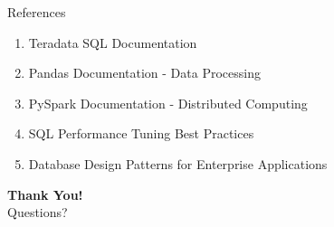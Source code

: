\documentclass{beamer}
\begin{document}
	\begin{frame}{References}
		\begin{enumerate}
			\item Teradata SQL Documentation
			\item Pandas Documentation - Data Processing
			\item PySpark Documentation - Distributed Computing
			\item SQL Performance Tuning Best Practices
			\item Database Design Patterns for Enterprise Applications
		\end{enumerate}
		\vspace{0.5cm}
		\begin{center}
			\Large{\textbf{Thank You!}} \\
			\vspace{0.3cm}
			\normalsize Questions?
		\end{center}
	\end{frame}
	
\end{document}
